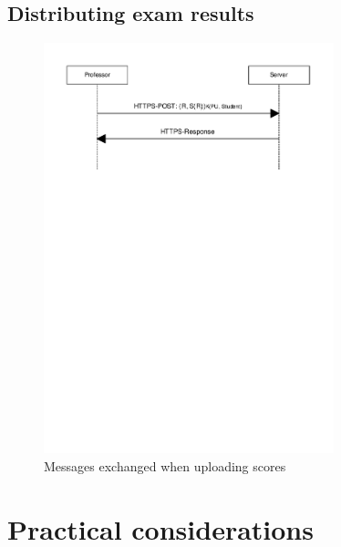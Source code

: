 \documentclass[12pt]{article}
\begin{document}
\subsection{Distributing exam results}
\label{subsec:impl-results}


\begin{figure}
  \begin{center}
  \includegraphics[width=0.75\textwidth]{images/upload_scores.pdf}
  \caption{Messages exchanged when uploading scores}
  \label{fig:upload-scores}
  \end{center}
\end{figure}


\section{Practical considerations}
\label{sec:practical}
\end{document}
